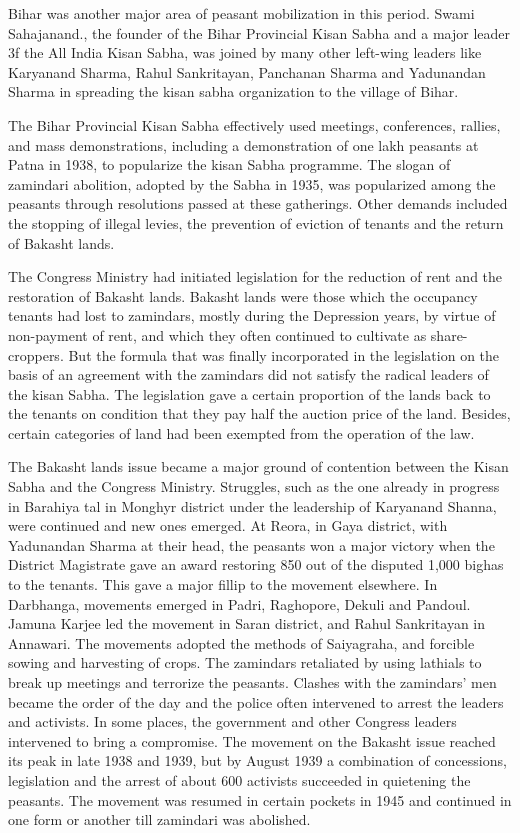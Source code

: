 Bihar was another major area of peasant mobilization in this period. Swami Sahajanand., the founder of the Bihar Provincial Kisan Sabha and a major leader 3f the All India Kisan Sabha, was joined by many other left-wing leaders like Karyanand Sharma, Rahul Sankritayan, Panchanan Sharma and Yadunandan Sharma in spreading the kisan sabha organization to the village of Bihar.

The Bihar Provincial Kisan Sabha effectively used meetings, conferences, rallies, and mass demonstrations, including a demonstration of one lakh peasants at Patna in 1938, to popularize the kisan Sabha programme. The slogan of zamindari abolition, adopted by the Sabha in 1935, was popularized among the peasants through resolutions passed at these gatherings. Other demands included the stopping of illegal levies, the prevention of eviction of tenants and the return of Bakasht lands.

The Congress Ministry had initiated legislation for the reduction of rent and the restoration of Bakasht lands. Bakasht lands were those which the occupancy tenants had lost to zamindars, mostly during the Depression years, by virtue of non-payment of rent, and which they often continued to cultivate as share-croppers. But the formula that was finally incorporated in the legislation on the basis of an agreement with the zamindars did not satisfy the radical leaders of the kisan Sabha. The legislation gave a certain proportion of the lands back to the tenants on condition that they pay half the auction price of the land. Besides, certain categories of land had been exempted from the operation of the law.

The Bakasht lands issue became a major ground of contention between the Kisan Sabha and the Congress Ministry. Struggles, such as the one already in progress in Barahiya tal in Monghyr district under the leadership of Karyanand Shanna, were continued and new ones emerged. At Reora, in Gaya district, with Yadunandan Sharma at their head, the peasants won a major victory when the District Magistrate gave an award restoring 850 out of the disputed 1,000 bighas to the tenants. This gave a major fillip to the movement elsewhere. In Darbhanga, movements emerged in Padri, Raghopore, Dekuli and Pandoul. Jamuna Karjee led the movement in Saran district, and Rahul Sankritayan in Annawari. The movements adopted the methods of Saiyagraha, and forcible sowing and harvesting of crops. The zamindars retaliated by using lathials to break up meetings and terrorize the peasants. Clashes with the zamindars' men became the order of the day and the police often intervened to arrest the leaders and activists. In some places, the government and other Congress leaders intervened to bring a compromise. The movement on the Bakasht issue reached its peak in late 1938 and 1939, but by August 1939 a combination of concessions, legislation and the arrest of about 600 activists succeeded in quietening the peasants. The movement was resumed in certain pockets in 1945 and continued in one form or another till zamindari was abolished.

